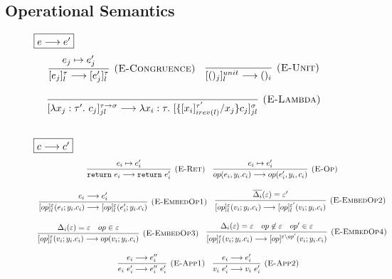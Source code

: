 \documentclass{article}
\theoremstyle{definition}
\begin{document}
\subsection{Operational Semantics}
\begin{figure}[H]
\footnotesize{


$\fbox{$e \longrightarrow e'$}$
\[
\begin{array}{c}
\infer[\textsc{(E-Congruence)}]
  {[e_j]^\tau_l \longrightarrow [e_j']^\tau_l}
  {e_j \mapsto e_j'} \quad 

\infer[\textsc{(E-Unit)}]
  {[()_j]^{unit}_l \longrightarrow ()_i}
  {} \\[3ex]
  
\infer[\textsc{(E-Lambda)}]
  {[\lambda x_j : \tau'.\ c_j]^{\tau \rightarrow \sigma}_{jl} \longrightarrow \lambda x_i : \tau.\ [\{[x_i]^{\tau'}_{irev(l)}/x_j\}c_j]^\sigma_{jl}}
  {} \\[3ex]
\end{array}
\]

$\fbox{$c \longrightarrow c'$}$
\[
\begin{array}{c}
\infer[\textsc{(E-Ret)}]
  {\texttt{return}\ e_i \longrightarrow \texttt{return}\ e_i'}
  {e_i \mapsto e_i'} \quad
  
\infer[\textsc{(E-Op)}]
  {op(e_i,y_i.c_i) \longrightarrow op(e_i', y_i, c_i)}
  {e_i \mapsto e_i'} \\[3ex]
 
 
\infer[\textsc{(E-EmbedOp1)}]
{[op]^\varepsilon_l(e_i; y_i.c_i) \longrightarrow [op]^{\varepsilon}_l(e_i'; y_i.c_i) }
{e_i \longrightarrow e_i'} \quad
 
\infer[\textsc{(E-EmbedOp2)}]
{[op]^\varepsilon_l(v_i; y_i.c_i) \longrightarrow [op]^{\varepsilon'}_l(v_i; y_i.c_i) }
{\overline{\Delta_i}(\varepsilon) = \varepsilon'} \\[3ex]

\infer[\textsc{(E-EmbedOp3)}]
{[op]^\varepsilon_l(v_i; y_i.c_i) \longrightarrow op(v_i; y_i.c_i) }
{\Delta_i(\varepsilon) = \varepsilon & op \in \varepsilon} \quad

\infer[\textsc{(E-EmbedOp4)}]
{[op]^\varepsilon_l(v_i; y_i.c_i) \longrightarrow [op]^{\varepsilon \setminus op'}(v_i; y_i.c_i) }
{\Delta_i(\varepsilon) = \varepsilon & op \not\in \varepsilon & op' \in \varepsilon} \\[3ex]


\infer[\textsc{(E-App1)}]
  {e_i\ e_i' \longrightarrow e_i''\ e_i'}
  {e_i \longrightarrow e_i''}  \quad
  
\infer[\textsc{(E-App2)}]
  {v_i \ e_i' \longrightarrow v_i\ e_i'}
  {e_i\longrightarrow e_i'}  \quad
  

\end{array}\]}
\end{figure}
\end{document}
